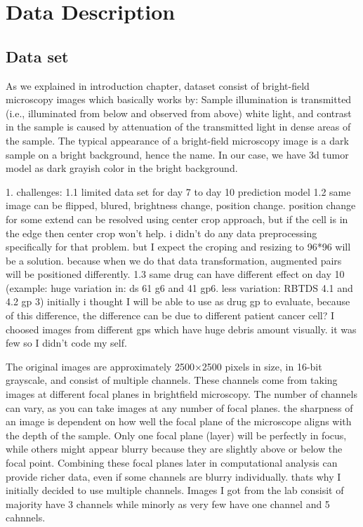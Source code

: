 \chapter{Data Description}\label{ch: Data Description}
\section{Data set}
\label{sec:Data set}

As we explained in introduction chapter, dataset consist of bright-field microscopy images which 
basically works by: 
Sample illumination is transmitted (i.e., illuminated from below and observed from above) 
white light, and contrast
in the sample is caused by attenuation of the transmitted light in dense areas of the sample. The
 typical appearance 
of a bright-field microscopy image is a dark sample on a bright background, hence the name.
In our case, we have   3d tumor model as dark grayish color in the bright background.

1. challenges:
1.1 limited data set for day 7 to day 10 prediction model
1.2 same image can be flipped, blured, brightness change, position change. position change for some extend can 
be resolved 
using center crop approach, but if the cell is in the edge then center crop won't help. i didn't do any data
 preprocessing
 specifically for that problem. but I expect the croping and resizing to 96*96 will be a solution. because 
 when we do that 
 data transformation, augmented pairs will be positioned differently.  
1.3 same drug can have different effect on day 10 (example: huge variation in: ds 61 g6 and 41 gp6. less variation: 
RBTDS 4.1 and 4.2 gp 3) initially i thought I will be able to use 
as drug gp to evaluate, because of this difference, the difference can be due to different patient cancer cell?
I choosed images from different gps which have huge debris amount visually. it was few so I didn't code my self.

The original images are approximately 2500×2500 pixels in size, in 16-bit grayscale,
 and consist of multiple channels. These channels come from taking images at different 
 focal planes in brightfield microscopy. The number of channels can vary, as you can take
  images at any number of focal planes. the sharpness of an image is dependent 
  on how well the focal plane of the microscope aligns with the depth of the sample. Only one focal plane
   (layer) will be perfectly in focus, while others might appear blurry because they are slightly above 
   or below the focal point. Combining these focal planes later in computational analysis can provide richer data,
    even if some channels are blurry individually. thats why I initially decided to use multiple channels.
  Images I got from the lab consisit of majority have 3 channels while minorly as very few have one channel and 
  5 cahnnels.

